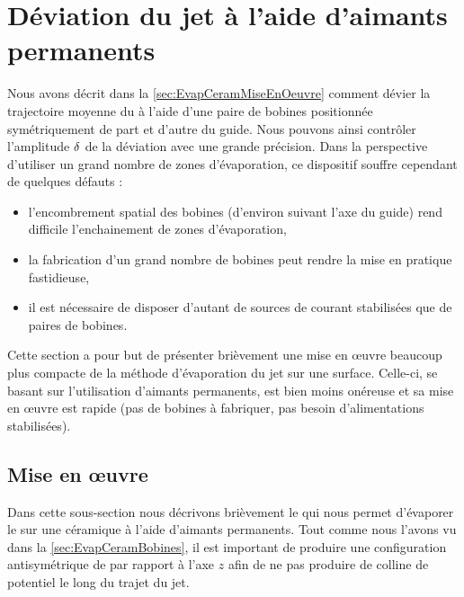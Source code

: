 \section{Déviation du jet à l'aide d'aimants permanents}\label{sec:EvapCeramAimants}
Nous avons décrit dans la \autoref{sec:EvapCeramMiseEnOeuvre} comment dévier la trajectoire moyenne du \jat à l'aide d'une paire de bobines positionnée symétriquement de part et d'autre du guide. Nous pouvons ainsi contrôler l'amplitude ${\delta}$ de la déviation avec une grande précision.
Dans la perspective d'utiliser un grand nombre de zones d'évaporation, ce dispositif souffre cependant de quelques défauts :
\begin{itemize}
	\item l'encombrement spatial des bobines (d'environ  suivant l'axe du guide) rend difficile l'enchainement de zones d'évaporation,
	\item la fabrication d'un grand nombre de bobines peut rendre la mise en pratique fastidieuse,
	\item il est nécessaire de disposer d'autant de sources de courant stabilisées que de paires de bobines.
\end{itemize}

Cette section a pour but de présenter brièvement une mise en \oe uvre beaucoup plus compacte de la méthode d'évaporation du jet sur une surface. Celle-ci, se basant sur l'utilisation d'aimants permanents, est bien moins onéreuse et sa mise en \oe uvre est rapide (pas de bobines à fabriquer, pas besoin d'alimentations stabilisées).

\subsection{Mise en \oe uvre}
Dans cette sous-section nous décrivons brièvement le \setup qui nous permet d'évaporer le \jat sur une céramique à l'aide d'aimants permanents.
Tout comme nous l'avons vu dans la \autoref{sec:EvapCeramBobines}, il est important de produire une configuration antisymétrique de \chm par rapport à l'axe $z$ afin de ne pas produire de colline de potentiel le long du trajet du jet. 

